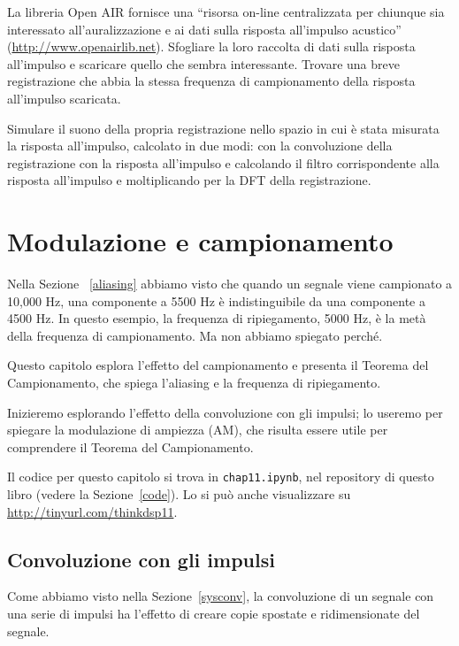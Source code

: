 \documentclass[12pt,a4paper]{book}
\begin{document}
\begin{exercise} La libreria Open AIR fornisce una ``risorsa on-line centralizzata per chiunque sia interessato all'auralizzazione e ai dati sulla risposta all'impulso acustico'' (\url{http://www.openairlib.net}). Sfogliare la loro raccolta di dati sulla risposta all'impulso e scaricare quello che sembra interessante. Trovare una breve registrazione che abbia la stessa frequenza di campionamento della risposta all'impulso scaricata.

Simulare il suono della propria registrazione nello spazio in cui è stata misurata la risposta all'impulso, calcolato in due modi: con la convoluzione della registrazione con la risposta all'impulso e calcolando il filtro corrispondente alla risposta all'impulso e moltiplicando per la DFT della registrazione. \end{exercise} 

\chapter{Modulazione e campionamento} 

Nella Sezione ~\ref{aliasing} abbiamo visto che quando un segnale viene campionato a 10,000 Hz, una componente a 5500 Hz è indistinguibile da una componente a 4500 Hz. In questo esempio, la frequenza di ripiegamento, 5000 Hz, è la metà della frequenza di campionamento. Ma non abbiamo spiegato perché.

Questo capitolo esplora l'effetto del campionamento e presenta il Teorema del Campionamento, che spiega l'aliasing e la frequenza di ripiegamento.

Inizieremo esplorando l'effetto della convoluzione con gli impulsi; lo useremo per spiegare la modulazione di ampiezza (AM), che risulta essere utile per comprendere il Teorema del Campionamento.

Il codice per questo capitolo si trova in {\tt chap11.ipynb}, nel repository di questo libro (vedere la Sezione~\ref{code}). Lo si può anche visualizzare su \url{http://tinyurl.com/thinkdsp11}.

\section{Convoluzione con gli impulsi} 

Come abbiamo visto nella Sezione~\ref{sysconv}, la convoluzione di un segnale con una serie di impulsi ha l'effetto di creare copie spostate e ridimensionate del segnale.
\end{document}
